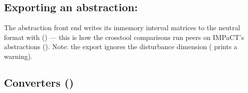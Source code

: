 \documentclass[a4paper,10pt,english]{sphinxmanual}
\begin{document}
\subsection{Exporting an abstraction: }
\label{\detokenize{manual/formats:exporting-an-abstraction-imdp-exportimdp}}
\sphinxAtStartPar
The abstraction front end writes its in\sphinxhyphen{}memory interval matrices to the neutral format
with  () — this is how the cross\sphinxhyphen{}tool
comparisons run peers on IMPaCT’s abstractions (). Note: the
export ignores the disturbance dimension ( prints a warning).


\subsection{Converters ()}
\label{\detokenize{manual/formats:converters-benchmarks-crosstool-peers}}
\end{document}
